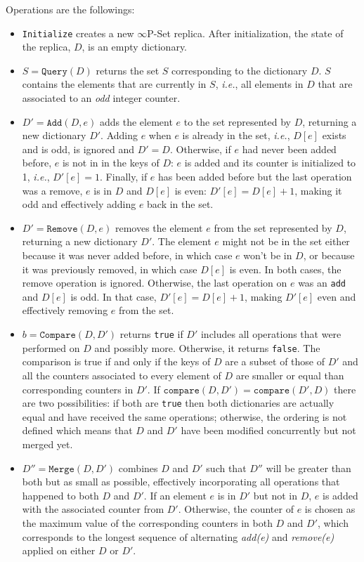 \documentclass[11pt, oneside]{article}   	%
\begin{document}
Operations are the followings:
\begin{itemize}

	\item \texttt{Initialize} creates a new $\infty$P-Set replica. After initialization, the state of the replica, $D$, is an empty dictionary. 

	\item $S=\texttt{Query}(D)$ returns the set $S$ corresponding to the dictionary $D$. $S$ contains the elements that are currently in $S$, \textit{i.e.}, all elements in $D$ that are associated to an \textit{odd} integer counter.

	\item $D'=\texttt{Add}(D,e)$ adds the element $e$ to the set represented by $D$, returning a new dictionary $D'$.  Adding $e$ when $e$ is already in the set, \textit{i.e.}, $D[e]$ exists and is odd, is ignored and $D'=D$. Otherwise, if $e$ had never been added before, $e$ is not in in the keys of $D$: $e$ is added and its counter is initialized to 1, \textit{i.e.}, $D'[e] = 1$. Finally, if $e$ has been added before but the last operation was a remove, $e$ is in $D$ and $D[e]$ is even: $D'[e] = D[e] + 1$, making it odd and effectively adding $e$ back in the set.

\item $D'=\texttt{Remove}(D, e)$ removes the element $e$ from the set represented by $D$, returning a new dictionary $D'$. The element $e$ might not be in the set either because it was never added before, in which case $e$ won't be in $D$, or because it was previously removed, in which case $D[e]$ is even. In both cases, the remove operation is ignored. Otherwise, the last operation on $e$ was an \texttt{add} and $D[e]$ is odd. In that case, $D'[e]=D[e]+1$, making $D'[e]$ even and effectively removing $e$ from the set.

\item $b=\texttt{Compare}(D, D')$ returns \texttt{true} if $D'$ includes all operations that were performed on $D$ and possibly more. Otherwise, it returns \texttt{false}. The comparison is true if and only if the keys of $D$ are a subset of those of $D'$ and all the counters associated to every element of $D$ are smaller or equal than corresponding counters in $D'$. If $\texttt{compare}(D,D')= \texttt{compare}(D',D)$ there are two possibilities: if both are \texttt{true} then both dictionaries are actually equal and have received the same operations; otherwise, the ordering is not defined which means that $D$ and $D'$ have been modified concurrently but not merged yet.

\item $D''=\texttt{Merge}(D, D')$ combines $D$ and $D'$ such that $D''$ will be greater than both but as small as possible, effectively incorporating all operations that happened to both $D$ and $D'$. If an element $e$ is  in $D'$ but not in $D$, $e$ is added with the associated counter from $D'$. Otherwise, the counter of $e$ is chosen as the maximum value of the corresponding counters in both $D$ and $D'$, which corresponds to the longest sequence of alternating \textit{add(e)} and \textit{remove(e)} applied on either $D$ or $D'$.
\end{itemize}
\end{document}
